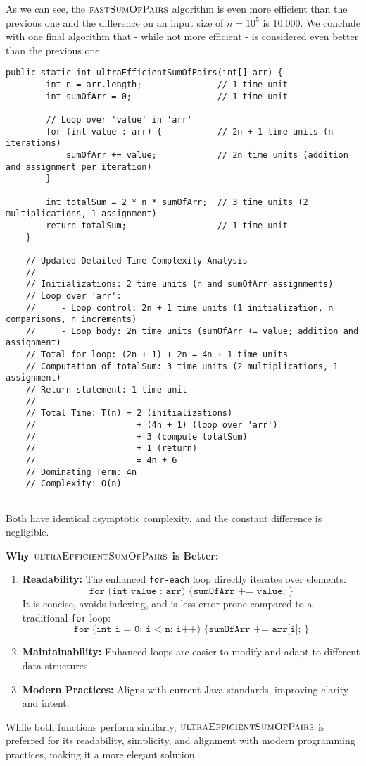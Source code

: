 As we can see, the $\proc{fastSumOfPairs}$ algorithm is even more efficient than the previous one and the difference on an input size of \(n = 10^5\) is 10,000. We conclude with one final algorithm that - while not more efficient - is considered even better than the previous one.

\begin{lstlisting}[style = javaStyle, caption={Ultra Efficient Sum of Pairs with Analysis}, label={lst:java_ultra_efficient_sum_pairs_analysis}]
    public static int ultraEfficientSumOfPairs(int[] arr) {
        int n = arr.length;               // 1 time unit
        int sumOfArr = 0;                 // 1 time unit
    
        // Loop over 'value' in 'arr'
        for (int value : arr) {           // 2n + 1 time units (n iterations)
            sumOfArr += value;            // 2n time units (addition and assignment per iteration)
        }
    
        int totalSum = 2 * n * sumOfArr;  // 3 time units (2 multiplications, 1 assignment)
        return totalSum;                  // 1 time unit
    }
    
    // Updated Detailed Time Complexity Analysis
    // -----------------------------------------
    // Initializations: 2 time units (n and sumOfArr assignments)
    // Loop over 'arr':
    //     - Loop control: 2n + 1 time units (1 initialization, n comparisons, n increments)
    //     - Loop body: 2n time units (sumOfArr += value; addition and assignment)
    // Total for loop: (2n + 1) + 2n = 4n + 1 time units
    // Computation of totalSum: 3 time units (2 multiplications, 1 assignment)
    // Return statement: 1 time unit
    //
    // Total Time: T(n) = 2 (initializations)
    //                    + (4n + 1) (loop over 'arr')
    //                    + 3 (compute totalSum)
    //                    + 1 (return)
    //                    = 4n + 6
    // Dominating Term: 4n
    // Complexity: O(n)
    
\end{lstlisting}  


Both have identical asymptotic complexity, and the constant difference is negligible.

\textbf{Why $\proc{ultraEfficientSumOfPairs}$ is Better:}
\begin{enumerate}
    \item \textbf{Readability:} The enhanced \texttt{for-each} loop directly iterates over elements:
    \[
    \texttt{for (int value : arr) \{ sumOfArr += value; \}}
    \]
    It is concise, avoids indexing, and is less error-prone compared to a traditional \texttt{for} loop:
    \[
    \texttt{for (int i = 0; i < n; i++) \{ sumOfArr += arr[i]; \}}
    \]
    \item \textbf{Maintainability:} Enhanced loops are easier to modify and adapt to different data structures.
    \item \textbf{Modern Practices:} Aligns with current Java standards, improving clarity and intent.
\end{enumerate}

While both functions perform similarly, $\proc{ultraEfficientSumOfPairs}$ is preferred for its readability, simplicity, and alignment with modern programming practices, making it a more elegant solution.


